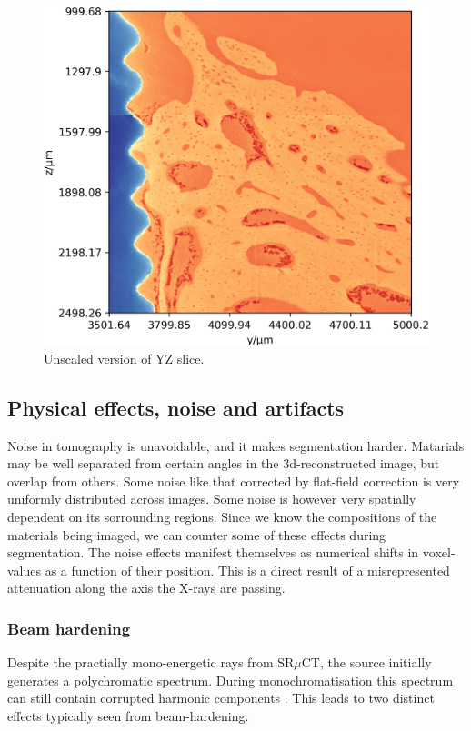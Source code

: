 \begin{figure}%
\centering
\includegraphics[width=\columnwidth]{figures/770c_pag-bic-yz-1x.png}
\caption{Unscaled version of YZ slice.}
\label{fig:yz-slice}
\end{figure}

\subsection{Physical effects, noise and artifacts}

Noise in tomography is unavoidable, and it makes segmentation harder. Matarials may be well separated from certain angles in the 3d-reconstructed image, but overlap from others. Some noise like that corrected by flat-field correction is very uniformly distributed across images. Some noise is however very spatially dependent on its sorrounding regions. Since we know the compositions of the materials being imaged, we can counter some of these effects during segmentation. The noise effects manifest themselves as numerical shifts in voxel-values as a function of their position. This is a direct result of a misrepresented attenuation along the axis the X-rays are passing. 

\subsubsection{Beam hardening}

Despite the practially mono-energetic rays from SR$\mu$CT, the source initially generates a polychromatic spectrum. During monochromatisation this spectrum can still contain corrupted harmonic components \citep{srnoise}. This leads to two distinct effects typically seen from beam-hardening.

